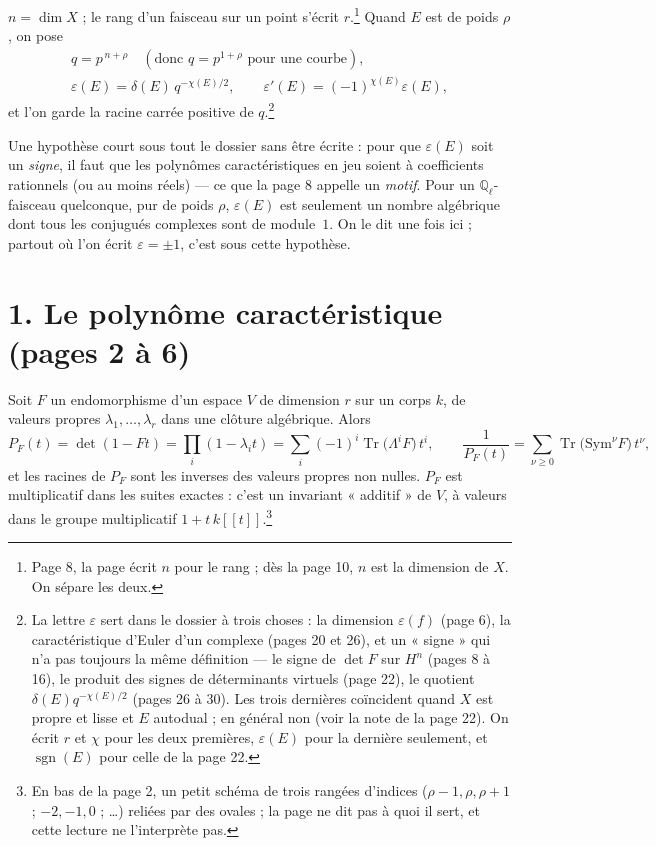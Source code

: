 \documentclass[11pt,a4paper]{article}
\begin{document}
$n = \dim X$ ; le rang d'un faisceau sur un point s'écrit $r$.\footnote{Page 8,
la page écrit $n$ pour le rang ; dès la page 10, $n$ est la dimension de $X$.
On sépare les deux.} Quand $E$ est de poids $\rho$, on pose
\[
  \begin{gathered}
  q = p^{\,n+\rho} \quad (\text{donc } q = p^{1+\rho} \text{ pour une courbe}),\\
  \varepsilon(E) = \delta(E)\, q^{-\chi(E)/2},
  \qquad \varepsilon'(E) = (-1)^{\chi(E)}\varepsilon(E),
  \end{gathered}
\]
et l'on garde la racine carrée positive de $q$.\footnote{La lettre
$\varepsilon$ sert dans le dossier à trois choses : la dimension
$\varepsilon(f)$ (page 6), la caractéristique d'Euler d'un complexe (pages 20
et 26), et un « signe » qui n'a pas toujours la même définition --- le signe
de $\det F$ sur $H^n$ (pages 8 à 16), le produit des signes de déterminants
virtuels (page 22), le quotient $\delta(E)q^{-\chi(E)/2}$ (pages 26 à 30). Les
trois dernières coïncident quand $X$ est propre et lisse et $E$ autodual ; en
général non (voir la note de la page 22). On écrit $r$ et $\chi$ pour les deux
premières, $\varepsilon(E)$ pour la dernière seulement, et
$\operatorname{sgn}(E)$ pour celle de la page 22.}

Une hypothèse court sous tout le dossier sans être écrite : pour que
$\varepsilon(E)$ soit un \emph{signe}, il faut que les polynômes
caractéristiques en jeu soient à coefficients rationnels (ou au moins réels) ---
ce que la page 8 appelle un \emph{motif}. Pour un $\mathbb{Q}_\ell$-faisceau
quelconque, pur de poids $\rho$, $\varepsilon(E)$ est seulement un nombre
algébrique dont tous les conjugués complexes sont de module~$1$. On le dit
une fois ici ; partout où l'on écrit $\varepsilon = \pm 1$, c'est sous cette
hypothèse.

\section*{1. Le polynôme caractéristique (pages 2 à 6)}

Soit $F$ un endomorphisme d'un espace $V$ de dimension $r$ sur un corps $k$,
de valeurs propres $\lambda_1, \dots, \lambda_r$ dans une clôture algébrique.
Alors
\[
  P_F(t) = \det(1 - Ft) = \prod_i (1 - \lambda_i t)
         = \sum_i (-1)^i \operatorname{Tr}\bigl(\Lambda^i F\bigr)\, t^i,
  \qquad
  \frac{1}{P_F(t)} = \sum_{\nu \ge 0} \operatorname{Tr}\bigl(\mathrm{Sym}^\nu F\bigr)\, t^\nu ,
\]
et les racines de $P_F$ sont les inverses des valeurs propres non nulles. $P_F$
est multiplicatif dans les suites exactes : c'est un invariant « additif » de
$V$, à valeurs dans le groupe multiplicatif $1 + t\,k[[t]]$.\footnote{En bas de
la page 2, un petit schéma de trois rangées d'indices ($\rho - 1, \rho,
\rho + 1$ ; $-2, -1, 0$ ; …) reliées par des ovales ; la page ne dit pas à
quoi il sert, et cette lecture ne l'interprète pas.}
\end{document}
